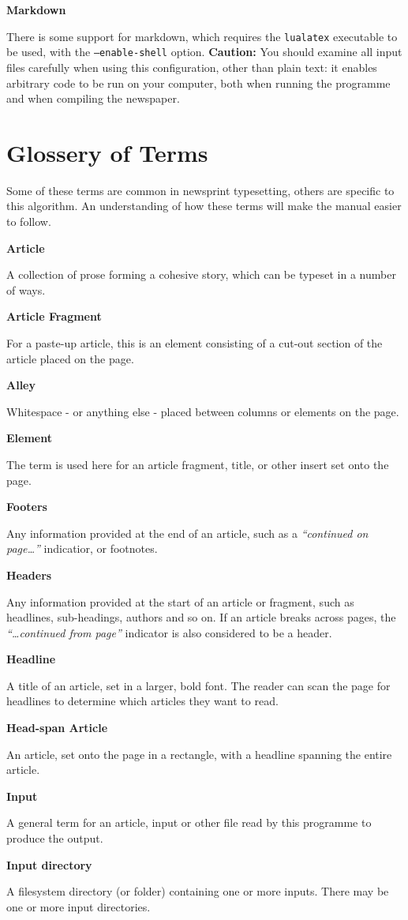 \documentclass[a4paper,DIV=11]{scrartcl}
\newcommand{\deft}[2]{\nopagebreak\noindent\hspace{0.5in}\textbf{#1}\par\noindent{}#2\pagebreak[1]\par}
\begin{document}
\deft{Markdown}{There is some support for markdown, which requires the
\texttt{lualatex} executable to be used, with the
\texttt{--enable-shell} option. \textbf{Caution:} You should examine
all input files carefully when using this configuration, other than
plain text: it enables arbitrary code to be run on your computer, both
when running the programme and when compiling the newspaper.}

\section{Glossery of Terms}

Some of these terms are common in newsprint typesetting, others are
specific to this algorithm. An understanding of how these terms will
make the manual easier to follow.

\vfil


\deft{Article}{A collection of prose forming a cohesive story, which
  can be typeset in a number of ways.}

\deft{Article Fragment}{For a paste-up article, this is an element
  consisting of a cut-out section of the article placed on the page.}

\deft{Alley}{Whitespace - or anything else - placed between columns or
  elements on the page.}

\deft{Element}{The term is used here for an article fragment, title,
  or other insert set onto the page.}

\deft{Footers}{Any information provided at the end of an
  article, such as a \textit{``continued on page\dots''} indicatior,
  or footnotes.}

\deft{Headers}{Any information provided at the start of an article or fragment,
  such as headlines, sub-headings, authors and so on. If an article
  breaks across pages, the \textit{``\dots continued from page''}
    indicator is also considered to be a header.}

\deft{Headline}{A title of an article, set in a larger, bold font. The
  reader can scan the page for headlines to determine which articles
  they want to read.}

\deft{Head-span Article}{An article, set onto the page in a rectangle,
  with a headline spanning the entire article.}

\deft{Input}{A general term for an article, input or other file read
  by this programme to produce the output.}

\deft{Input directory}{A filesystem directory (or folder) containing
  one or more inputs. There may be one or more input directories.}
\end{document}
